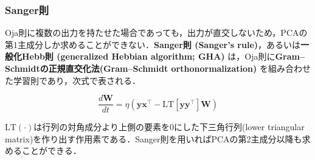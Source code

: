 \subsubsection{Sanger則}
Oja則に複数の出力を持たせた場合であっても，出力が直交しないため，PCAの第1主成分しか求めることができない．\textbf{Sanger則 (Sanger's rule)}，あるいは\textbf{一般化Hebb則 (generalized Hebbian algorithm; GHA)} は，Oja則に\textbf{Gram–Schmidtの正規直交化法(Gram–Schmidt orthonormalization)} を組み合わせた学習則であり，次式で表される．


\begin{equation}
\frac{d\mathbf{W}}{dt} = \eta \left(\mathbf{y}\mathbf{x}^\top - \mathrm{LT}\left[\mathbf{y}\mathbf{y}^\top\right] \mathbf{W}\right)
\end{equation}


$\mathrm{LT}(\cdot)$は行列の対角成分より上側の要素を0にした下三角行列(lower triangular matrix)を作り出す作用素である．Sanger則を用いればPCAの第2主成分以降も求めることができる．
